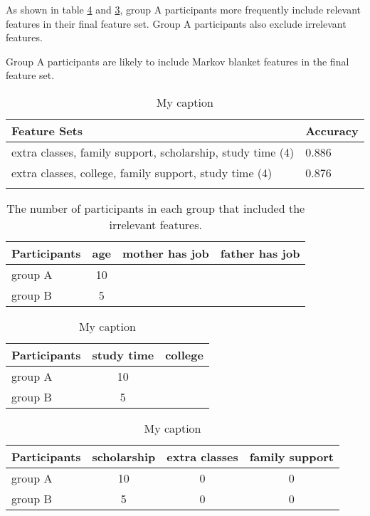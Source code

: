 As shown in table \ref{RevelantFSBasedOnCausal} and \ref{RelevantFSBasedOnImportance}, group A participants more frequently include relevant features in their final feature set. Group A participants also exclude irrelevant features.

Group A participants are likely to include Markov blanket features in the final feature set.

\begin{table}[]
\centering
\begin{tabular}{ll}
\hline
Feature Sets                                               & Accuracy \\ \hline
extra classes, family support, scholarship, study time (4) & 0.886    \\
extra classes, college, family support, study time (4)     & 0.876    \\
                                                           &
\end{tabular}
\caption{My caption}
\label{relevantFS}
\end{table}

\begin{table}[]
\centering
\begin{tabular}{lccc}
\hline
Participants & \multicolumn{1}{l}{age} & \multicolumn{1}{l}{mother has job} & \multicolumn{1}{l}{father has job} \\ \hline
group A      & 10                      &                                    &                                    \\
group B      & 5                       &                                    &
\end{tabular}
\caption{The number of participants in each group that included the irrelevant features.}
\label{IrrelevantFeatures}
\end{table}

\begin{table}[]
\centering
\begin{tabular}{lcc}
\hline
Participants & \multicolumn{1}{l}{study time} & \multicolumn{1}{l}{college} \\ \hline
group A      & 10                             &                             \\
group B      & 5                              &
\end{tabular}
\caption{My caption}
\label{RelevantFSBasedOnImportance}
\end{table}

\begin{table}[]
\centering
\begin{tabular}{lccc}
\hline
Participants & \multicolumn{1}{l}{scholarship} & \multicolumn{1}{l}{extra classes} & \multicolumn{1}{l}{family support} \\ \hline
group A      & 10                              & 0                                 & 0                                  \\
group B      & 5                               & 0                                 & 0
\end{tabular}
\caption{My caption}
\label{RevelantFSBasedOnCausal}
\end{table}

